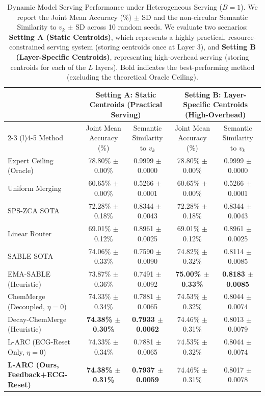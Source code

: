 \begin{table}[t]
\caption{Dynamic Model Serving Performance under Heterogeneous Serving ($B=1$). We report the Joint Mean Accuracy (\%) $\pm$ SD and the non-circular Semantic Similarity to $v_k$ $\pm$ SD across 10 random seeds. We evaluate two scenarios: \textbf{Setting A (Static Centroids)}, which represents a highly practical, resource-constrained serving system (storing centroids once at Layer 3), and \textbf{Setting B (Layer-Specific Centroids)}, representing high-overhead serving (storing centroids for each of the $L$ layers). Bold indicates the best-performing method (excluding the theoretical Oracle Ceiling).}
\label{tab:main_results}
\vskip 0.15in
\begin{center}
\begin{small}
\begin{tabular}{lcccc}
\toprule
& \multicolumn{2}{c}{\textbf{Setting A: Static Centroids (Practical Serving)}} & \multicolumn{2}{c}{\textbf{Setting B: Layer-Specific Centroids (High-Overhead)}} \\
\cmidrule(r){2-3} \cmidrule(l){4-5}
Method & Joint Mean Accuracy (\%) & Semantic Similarity to $v_k$ & Joint Mean Accuracy (\%) & Semantic Similarity to $v_k$ \\
\midrule
Expert Ceiling (Oracle) & 78.80\% $\pm$ 0.00\% & 0.9999 $\pm$ 0.0000 & 78.80\% $\pm$ 0.00\% & 0.9999 $\pm$ 0.0000 \\
Uniform Merging & 60.65\% $\pm$ 0.00\% & 0.5266 $\pm$ 0.0001 & 60.65\% $\pm$ 0.00\% & 0.5266 $\pm$ 0.0001 \\
SPS-ZCA SOTA \cite{spszca2025} & 72.28\% $\pm$ 0.18\% & 0.8344 $\pm$ 0.0043 & 72.28\% $\pm$ 0.18\% & 0.8344 $\pm$ 0.0043 \\
Linear Router & 69.01\% $\pm$ 0.12\% & 0.8961 $\pm$ 0.0025 & 69.01\% $\pm$ 0.12\% & 0.8961 $\pm$ 0.0025 \\
SABLE SOTA \cite{sable2025} & 74.06\% $\pm$ 0.33\% & 0.7590 $\pm$ 0.0090 & 74.82\% $\pm$ 0.32\% & 0.8114 $\pm$ 0.0085 \\
EMA-SABLE (Heuristic) & 73.87\% $\pm$ 0.36\% & 0.7491 $\pm$ 0.0092 & \textbf{75.00\% $\pm$ 0.33\%} & \textbf{0.8183 $\pm$ 0.0085} \\
ChemMerge (Decoupled, $\eta=0$) & 74.33\% $\pm$ 0.34\% & 0.7881 $\pm$ 0.0065 & 74.53\% $\pm$ 0.32\% & 0.8044 $\pm$ 0.0074 \\
Decay-ChemMerge (Heuristic) & \textbf{74.38\% $\pm$ 0.30\%} & \textbf{0.7933 $\pm$ 0.0062} & 74.46\% $\pm$ 0.31\% & 0.8013 $\pm$ 0.0079 \\
L-ARC (ECG-Reset Only, $\eta=0$) & 74.33\% $\pm$ 0.34\% & 0.7881 $\pm$ 0.0065 & 74.53\% $\pm$ 0.32\% & 0.8044 $\pm$ 0.0074 \\
\midrule
\textbf{L-ARC (Ours, Feedback+ECG-Reset)} & \textbf{74.38\% $\pm$ 0.31\%} & \textbf{0.7937 $\pm$ 0.0059} & 74.46\% $\pm$ 0.31\% & 0.8017 $\pm$ 0.0078 \\
\bottomrule
\end{tabular}
\end{small}
\end{center}
\vskip -0.1in
\end{table}

